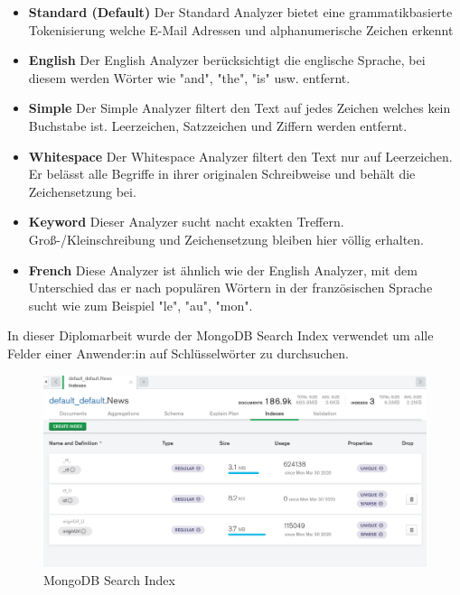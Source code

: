 \begin{itemize}
    \item \textbf{Standard (Default)}
        \newline
        Der Standard Analyzer bietet eine grammatikbasierte Tokenisierung welche E-Mail Adressen und alphanumerische Zeichen erkennt
    \item \textbf{English}
        \newline
        Der English Analyzer berücksichtigt die englische Sprache, bei diesem werden Wörter wie "and", "the", "is" usw. entfernt.
    \item \textbf{Simple}
        \newline
        Der Simple Analyzer filtert den Text auf jedes Zeichen welches kein Buchstabe ist. Leerzeichen, Satzzeichen und Ziffern werden entfernt.
    \item \textbf{Whitespace}
        \newline
        Der Whitespace Analyzer filtert den Text nur auf Leerzeichen. Er belässt alle Begriffe in ihrer originalen Schreibweise und behält die Zeichensetzung bei.
    \item \textbf{Keyword}
        \newline
        Dieser Analyzer sucht nacht exakten Treffern. Groß-/Kleinschreibung und Zeichensetzung bleiben hier völlig erhalten.
    \item \textbf{French}
        \newline
        Diese Analyzer ist ähnlich wie der English Analyzer, mit dem Unterschied das er nach populären Wörtern in der französischen Sprache sucht wie zum Beispiel "le", "au", "mon".
\end{itemize}

In dieser Diplomarbeit wurde der MongoDB Search Index verwendet um alle Felder einer Anwender:in auf Schlüsselwörter zu durchsuchen.
\cite{Search_Indexes}
\cite{Atlas_Indexes}

\begin{figure}[h!]
    \centering
    \includegraphics[width=0.7\linewidth]{pics/mongodb-search-indizes.png}
    \caption{MongoDB Search Index}
    \label{fig:enter-label}
\end{figure}




